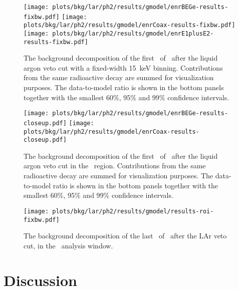 \begin{figure}
  \centering
  \texttt{[image: plots/bkg/lar/ph2/results/gmodel/enrBEGe-results-fixbw.pdf]}
  \texttt{[image: plots/bkg/lar/ph2/results/gmodel/enrCoax-results-fixbw.pdf]}
  \texttt{[image: plots/bkg/lar/ph2/results/gmodel/enrE1plusE2-results-fixbw.pdf]}
  \caption{%
    The background decomposition of the first \gexpophasetwobkg\ of \gerdatwo\ after the
    liquid argon veto cut with a fixed-width 15~keV binning. Contributions from the same
    radioactive decay are summed for visualization purposes. The data-to-model ratio is
    shown in the bottom panels together with the smallest 60\%, 95\% and 99\% confidence
    intervals.
  }\label{fig:bkg:lar:ph2:results-fixbw}
\end{figure}

\begin{figure}
  \centering
  \texttt{[image: plots/bkg/lar/ph2/results/gmodel/enrBEGe-results-closeup.pdf]}
  \texttt{[image: plots/bkg/lar/ph2/results/gmodel/enrCoax-results-closeup.pdf]}
  \caption{%
    The background decomposition of the first \gexpophasetwobkg\ of \gerdatwo\ after the
    liquid argon veto cut in the \nnbb\ region. Contributions from the same radioactive
    decay are summed for visualization purposes. The data-to-model ratio is shown in the
    bottom panels together with the smallest 60\%, 95\% and 99\% confidence intervals.
  }\label{fig:bkg:lar:ph2:results-closeup}
\end{figure}

\begin{figure}
  \centering
  \texttt{[image: plots/bkg/lar/ph2/results/gmodel/results-roi-fixbw.pdf]}
  \caption{%
    The background decomposition of the last \gexpophasetwopbkg\ of \gerdatwo\ after the
    LAr veto cut, in the \onbb\ analysis window.
  }\label{fig:bkg:lar:ph2:results:roi}
\end{figure}

\section{Discussion}%
\label{sec:bkg:lar:ph2:discussion}

